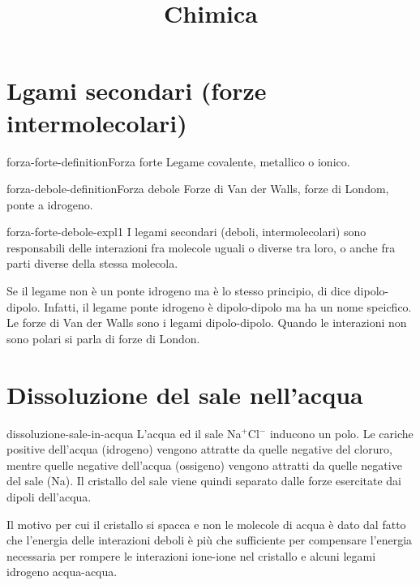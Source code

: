 \documentclass[preview]{standalone}
\begin{document}
\title{Chimica}
\genpage

\section{Lgami secondari (forze intermolecolari)}

\begin{snippetdefinition}{forza-forte-definition}{Forza forte}
    Legame covalente, metallico o ionico.
\end{snippetdefinition}

\begin{snippetdefinition}{forza-debole-definition}{Forza debole}
    Forze di Van der Walls, forze di Londom, ponte a idrogeno.
\end{snippetdefinition}

\begin{snippet}{forza-forte-debole-expl1}
    I legami secondari (deboli, intermolecolari) sono responsabili delle interazioni fra molecole uguali o diverse tra loro,
    o anche fra parti diverse della stessa molecola.

    Se il legame non è un ponte idrogeno ma è lo stesso principio, di dice dipolo-dipolo.
    Infatti, il legame ponte idrogeno è dipolo-dipolo ma ha un nome speicfico.
    Le forze di Van der Walls sono i legami dipolo-dipolo.
    Quando le interazioni non sono polari si parla di forze di London.
\end{snippet}

\section{Dissoluzione del sale nell'acqua}

\begin{snippet}{dissoluzione-sale-in-acqua}
L'acqua ed il sale Na\(^{+}\)Cl\(^{-}\) inducono un polo.
Le cariche positive dell'acqua (idrogeno) vengono attratte da quelle negative
del cloruro, mentre quelle negative dell'acqua (ossigeno)
vengono attratti da quelle negative del sale (Na).
Il cristallo del sale viene quindi separato dalle forze
esercitate dai dipoli dell'acqua.

Il motivo per cui il cristallo si spacca e non le molecole di acqua
è dato dal fatto che l'energia delle interazioni deboli è più che sufficiente
per compensare l'energia necessaria per rompere le interazioni ione-ione
nel cristallo e alcuni legami idrogeno acqua-acqua.
\end{snippet}
\end{document}
